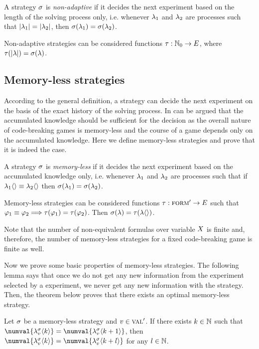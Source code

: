 \begin{definition}
A strategy $\sigma$ is \emph{non-adaptive} if it decides the next experiment
  based on the length of the solving process only, i.e.
  whenever $\lambda_1$ and $\lambda_2$ are processes such that
  $|\lambda_1| = |\lambda_2|$,
  then
  $\sigma(\lambda_1) = \sigma(\lambda_2)$.

Non-adaptive strategies can be considered functions $\tau: \mathbb{N}_0 -> E$,
where $\tau(|\lambda|) = \sigma(\lambda)$.
\end{definition}

\subsection{Memory-less strategies}

According to the general definition,
  a strategy can decide the next experiment on the basis of the exact history
  of the solving process.
In can be argued that the accumulated knowledge should be sufficient for
  the decision as the overall nature of code-breaking games is memory-less
  and the course of a game depends only on the accumulated knowledge.
Here we define memory-less strategies and prove that it is indeed the case.

\begin{definition}
A strategy $\sigma$ is \emph{memory-less} if it decides the next experiment
  based on the accumulated knowledge only, i.e.
  whenever $\lambda_1$ and $\lambda_2$ are processes such that if
  $\lambda_1\langle\rangle \equiv \lambda_2\langle\rangle$
  then
  $\sigma(\lambda_1) = \sigma(\lambda_2)$.

Memory-less strategies can be considered functions
  $\tau: {\textsc{form}'} -> E$ such that
  $\varphi_1\equiv\varphi_2 ==> \tau(\varphi_1)=\tau(\varphi_2)$.
Then $\sigma(\lambda) = \tau(\lambda\langle\rangle)$.
\end{definition}

Note that the number of non-equivalent formulas over variable $X$
  is finite and, therefore, the number of memory-less strategies for a fixed
  code-breaking game is finite as well.

Now we prove some basic properties of memory-less strategies.
The following lemma says that once we do not get any new information
  from the experiment selected by a experiment,
  we never get any new information with the strategy.
Then, the theorem below proves that there exists an optimal
  memory-less strategy.

\begin{lemma}
Let $\sigma$ be a memory-less strategy and $v\in\textsc{val}'$.
If there exists $k\in\mathbb{N}$ such that
  $\numval{\stgknow{\stg}{\val}{k}} = \numval{\stgknow{\stg}{\val}{k+1}}$,
 then
  $\numval{\stgknow{\stg}{\val}{k}} = \numval{\stgknow{\stg}{\val}{k+l}}$
 for any $l\in\mathbb{N}$.
\end{lemma}

